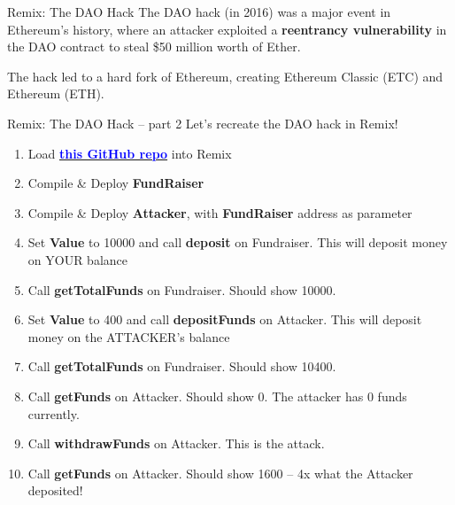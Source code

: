 \documentclass[aspectratio=169]{beamer}
\newcommand{\bluelink}[2]{\href{#1}{\textcolor{blue}{\textbf{#2}}}}
\begin{document}
\begin{frame}{Remix: The DAO Hack}
The DAO hack (in 2016) was a major event in Ethereum's history, where an attacker
exploited a \textbf{reentrancy vulnerability} in the DAO contract to steal \$50 million
worth of Ether.

The hack led to a hard fork of Ethereum, creating Ethereum
Classic (ETC) and Ethereum (ETH).
\end{frame}

\begin{frame}{Remix: The DAO Hack -- part 2}
Let's recreate the DAO hack in Remix!

\begin{enumerate}
\item    Load \bluelink{https://github.com/msooseth/reentrancy-attack}{this GitHub repo} into Remix
\item    Compile \& Deploy \textbf{FundRaiser}
\item    Compile \& Deploy \textbf{Attacker}, with \textbf{FundRaiser} address as parameter
\item    Set \textbf{Value} to 10000 and call \textbf{deposit} on Fundraiser. This will deposit money on YOUR balance
\item    Call \textbf{getTotalFunds} on Fundraiser. Should show 10000.
\item    Set \textbf{Value} to 400 and call \textbf{depositFunds} on Attacker. This will deposit money on the ATTACKER's balance
\item    Call \textbf{getTotalFunds} on Fundraiser. Should show 10400.
\item    Call \textbf{getFunds} on Attacker. Should show 0. The attacker has 0 funds currently.
\item    Call \textbf{withdrawFunds} on Attacker. This is the attack.
\item    Call \textbf{getFunds} on Attacker. Should show 1600 -- 4x what the Attacker deposited!
\end{enumerate}
\end{frame}
\end{document}

